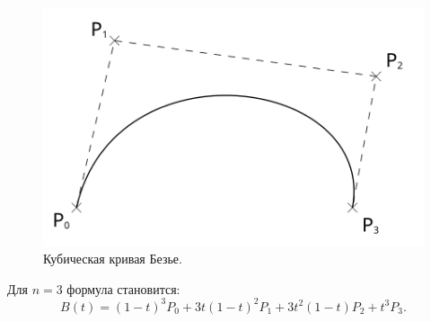 \begin{figure}[H]
    \begin{center}
        \begin{minipage}[h]{0.4\linewidth}
            \includegraphics[width=1\textwidth]{Bezier_curve.png}
            \caption{Кубическая кривая Безье.}
            \label{ris:curve}
        \end{minipage}
    \end{center}
\end{figure}

Для \(n = 3\) формула становится:
\[
    B(t) = (1-t)^3 P_0 + 3t(1-t)^2  P_1 + 3t^2(1-t) P_2 + t^3 P_3.
\]